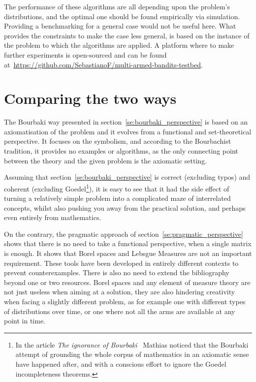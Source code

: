 \documentclass[]{scrartcl}
\theoremstyle{definition}
\begin{document}
The performance of these algorithms are all depending upon the problem's distributions, and the optimal one should be found empirically via simulation. Providing a benchmarking for a general case would not be useful here. What provides the constraints to make the case less general, is based on the instance of the problem to which the algorithms are applied. A platform where to make further experiments is open-sourced and can be found at~\href{https://github.com/SebastianoF/multi-armed-bandits-testbed}{https://github.com/SebastianoF/multi-armed-bandits-testbed}.


\section{Comparing the two ways}
\label{se:outro}

The Bourbaki way presented in section~\ref{se:bourbaki_perspective} is based on an axiomatisation of the problem and it evolves from a functional and set-theoretical perspective. It focuses on the symbolism, and according to the Bourbachist tradition, it provides no examples or algorithms, as the only connecting point between the theory and the given problem is the axiomatic setting.

Assuming that section~\ref{se:bourbaki_perspective} is correct (excluding typos) and coherent (excluding Goedel\footnote{
    In the article \emph{The ignorance of Bourbaki}~\cite{mathias1992ignorance} Mathias noticed that the Bourbaki attempt of grounding the whole corpus of mathematics in an axiomatic sense have happened after, and with a conscious effort to ignore the Goedel incompleteness theorems.
}), it is easy to see that it had the side effect of turning a relatively simple problem into a complicated maze of interrelated concepts, whilst also pushing you away from the practical solution, and perhaps even entirely from mathematics.

On the contrary, the pragmatic approach of section~\ref{se:pragmatic_perspective} shows that there is no need to take a functional perspective, when a single matrix is enough. It shows that Borel spaces and Lebsgue Measures are not an important requirement. These tools have been developed in entirely different contexts to prevent counterexamples. There is also no need to extend the bibliography beyond one or two resources. Borel spaces and any element of measure theory are not just useless when aiming at a solution, they are also hindering creativity when facing a slightly different problem, as for example one with different types of distributions over time, or one where not all the arms are available at any point in time. 
\end{document}
